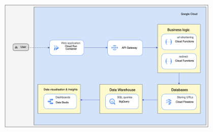 \documentclass[aspectratio=169,16pt]{beamer}
\begin{document}
\begin{frame}
\begin{columns}[onlytextwidth]
\begin{column}{0.5\textwidth}
        \end{column}%
        \begin{column}{0.5\textwidth}
            \begin{center}
                \begin{figure}
                    \centering\includegraphics[height=.5\paperheight]{architecture}
                \end{figure}
            \end{center}
        \end{column}
    \end{columns}
\end{frame}
\end{document}
